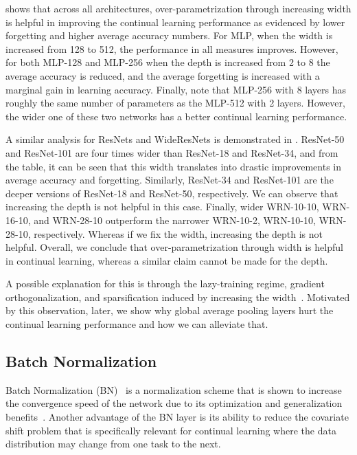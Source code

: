  shows that across all architectures, over-parametrization through increasing width is helpful in improving the continual learning performance as evidenced by lower forgetting and higher average accuracy numbers. For MLP, when the width is increased from 128 to 512, the performance in all measures improves. However, 
for both MLP-128 and MLP-256 when the depth is increased from 2 to 8 the average accuracy is reduced, and the average forgetting is increased with a marginal gain in learning accuracy. Finally, note that MLP-256 with 8 layers has roughly the same number of parameters as the MLP-512 with 2 layers. However, the wider one of these two networks has a better continual learning performance.

A similar analysis for ResNets and WideResNets is demonstrated in . ResNet-50 and ResNet-101 are four times wider than ResNet-18 and ResNet-34, and from the table, it can be seen that this width translates into drastic improvements in average accuracy and forgetting. Similarly, ResNet-34 and ResNet-101 are the deeper versions of ResNet-18 and ResNet-50, respectively. We can observe that increasing the depth is not helpful in this case. Finally, wider WRN-10-10, WRN-16-10, and WRN-28-10 outperform the narrower WRN-10-2, WRN-10-10, WRN-28-10, respectively. Whereas if we fix the width, increasing the depth is not helpful. Overall, we conclude that over-parametrization through width is helpful in continual learning, whereas a similar claim cannot be made for the depth. 

A possible explanation for this is through the lazy-training regime, gradient orthogonalization, and sparsification induced by increasing the width~\citep{Mirzadeh2021WideNN}. Motivated by this observation, later, we show why global average pooling layers hurt the continual learning performance and how we can alleviate that.




\subsection{Batch Normalization} 
\label{sec:batch-norm}


Batch Normalization (BN)~\citep{BN-IoffeS15} is a normalization scheme that is shown to increase the convergence speed of the network due to its optimization and generalization benefits~\citep{BN-Santurkar,BN-Understand}. Another advantage of the BN layer is its ability to reduce the covariate shift problem that is specifically relevant for continual learning where the data distribution may change from one task to the next. 

